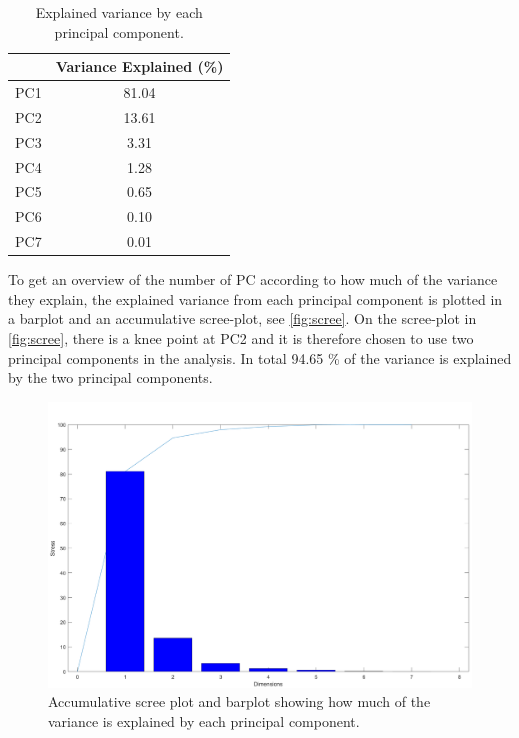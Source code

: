\begin{table}[H]
\centering
\begin{tabular}{lc}
\hline
                         & \multicolumn{1}{l}{Variance Explained (\%)} \\ \hline
\multicolumn{1}{l|}{PC1} & 81.04                                       \\
\multicolumn{1}{l|}{PC2} & 13.61                                       \\
\multicolumn{1}{l|}{PC3} & 3.31                                        \\
\multicolumn{1}{l|}{PC4} & 1.28                                        \\
\multicolumn{1}{l|}{PC5} & 0.65                                        \\
\multicolumn{1}{l|}{PC6} & 0.10                                        \\
\multicolumn{1}{l|}{PC7} & 0.01                                       
\end{tabular}
\caption{Explained variance by each principal component.}
\label{tab:explained}
\end{table}
\noindent
%
To get an overview of the number of PC according to how much of the variance they explain, the explained variance from each principal component is plotted in a barplot and an accumulative scree-plot, see \autoref{fig:scree}. On the scree-plot in \autoref{fig:scree}, there is a knee point at PC2 and it is therefore chosen to use two principal components in the analysis. In total 94.65 \% of the variance is explained by the two principal components.
%
\begin{figure}[H]
\centering
\includegraphics[width =\textwidth]{Figure/Screeplot}
\caption{Accumulative scree plot and barplot showing how much of the variance is explained by each principal component.}
\label{fig:scree}
\end{figure}
